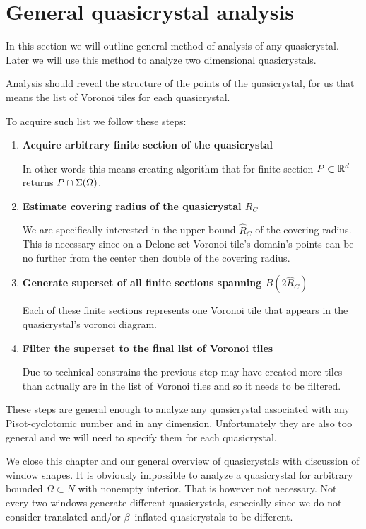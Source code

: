 \documentclass[text.tex]{subfiles}
\begin{document}
\section{General quasicrystal analysis}
In this section we will outline general method of analysis of any quasicrystal. Later we will use this method to analyze two dimensional quasicrystals. 

Analysis should reveal the structure of the points of the quasicrystal, for us that means the list of Voronoi tiles for each quasicrystal. 

To acquire such list we follow these steps: 
\begin{enumerate}
\item \textbf{Acquire arbitrary finite section of the quasicrystal}

In other words this means creating algorithm that for finite section $P\subset\mathbb{R}^d$ returns $P\cap\Sigma(\Omega)$. 
\item \textbf{Estimate covering radius of the quasicrystal $R_C$}

We are specifically interested in the upper bound $\hat{R}_C$ of the covering radius. This is necessary since on a Delone set Voronoi tile's domain's points can be no further from the center then double of the covering radius. 
\item \textbf{Generate superset of all finite sections spanning $B(2\hat{R}_C)$}

Each of these finite sections represents one Voronoi tile that appears in the quasicrystal's voronoi diagram. 
\item \textbf{Filter the superset to the final list of Voronoi tiles}

Due to technical constrains the previous step may have created more tiles than actually are in the list of Voronoi tiles and so it needs to be filtered. 
\end{enumerate}

These steps are general enough to analyze any quasicrystal associated with any Pisot-cyclotomic number and in any dimension. Unfortunately they are also too general and we will need to specify them for each quasicrystal. 

We close this chapter and our general overview of quasicrystals with discussion of window shapes. It is obviously impossible to analyze a quasicrystal for arbitrary bounded $\Omega\subset N$ with nonempty interior. That is however not necessary. Not every two windows generate different quasicrystals, especially since we do not consider translated and/or $\beta$~inflated quasicrystals to be different. 
\end{document}
